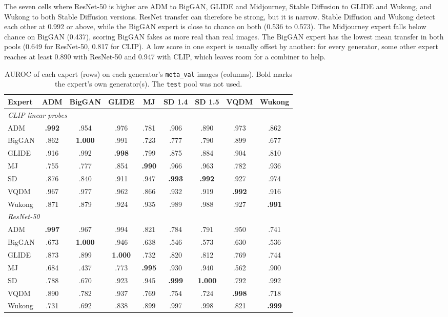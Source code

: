 \documentclass[10pt,a4paper]{article}
\begin{document}
The seven cells where ResNet-50 is higher are ADM to BigGAN, GLIDE and Midjourney, Stable Diffusion to GLIDE and Wukong, and Wukong to both Stable Diffusion versions. ResNet transfer can therefore be strong, but it is narrow. Stable Diffusion and Wukong detect each other at 0.992 or above, while the BigGAN expert is close to chance on both (0.536 to 0.573). The Midjourney expert falls below chance on BigGAN (0.437), scoring BigGAN fakes as more real than real images. The BigGAN expert has the lowest mean transfer in both pools (0.649 for ResNet-50, 0.817 for CLIP). A low score in one expert is usually offset by another: for every generator, some other expert reaches at least 0.890 with ResNet-50 and 0.947 with CLIP, which leaves room for a combiner to help.

\begin{table}[t]
\centering
\small
\setlength{\tabcolsep}{4pt}
\begin{tabular}{lcccccccc}
\toprule
Expert & ADM & BigGAN & GLIDE & MJ & SD 1.4 & SD 1.5 & VQDM & Wukong \\
\midrule
\multicolumn{9}{l}{\textit{CLIP linear probes}} \\
ADM    & \textbf{.992} & .954 & .976 & .781 & .906 & .890 & .973 & .862 \\
BigGAN & .862 & \textbf{1.000} & .991 & .723 & .777 & .790 & .899 & .677 \\
GLIDE  & .916 & .992 & \textbf{.998} & .799 & .875 & .884 & .904 & .810 \\
MJ     & .755 & .777 & .854 & \textbf{.990} & .966 & .963 & .782 & .936 \\
SD     & .876 & .840 & .911 & .947 & \textbf{.993} & \textbf{.992} & .927 & .974 \\
VQDM   & .967 & .977 & .962 & .866 & .932 & .919 & \textbf{.992} & .916 \\
Wukong & .871 & .879 & .924 & .935 & .989 & .988 & .927 & \textbf{.991} \\
\midrule
\multicolumn{9}{l}{\textit{ResNet-50}} \\
ADM    & \textbf{.997} & .967 & .994 & .821 & .784 & .791 & .950 & .741 \\
BigGAN & .673 & \textbf{1.000} & .946 & .638 & .546 & .573 & .630 & .536 \\
GLIDE  & .873 & .899 & \textbf{1.000} & .732 & .820 & .812 & .769 & .744 \\
MJ     & .684 & .437 & .773 & \textbf{.995} & .930 & .940 & .562 & .900 \\
SD     & .788 & .670 & .923 & .945 & \textbf{.999} & \textbf{1.000} & .792 & .992 \\
VQDM   & .890 & .782 & .937 & .769 & .754 & .724 & \textbf{.998} & .718 \\
Wukong & .731 & .692 & .838 & .899 & .997 & .998 & .821 & \textbf{.999} \\
\bottomrule
\end{tabular}
\caption{AUROC of each expert (rows) on each generator's \texttt{meta\_val} images (columns). Bold marks the expert's own generator(s). The \texttt{test} pool was not used.}
\label{tab:cross-auroc}
\end{table}
\end{document}
